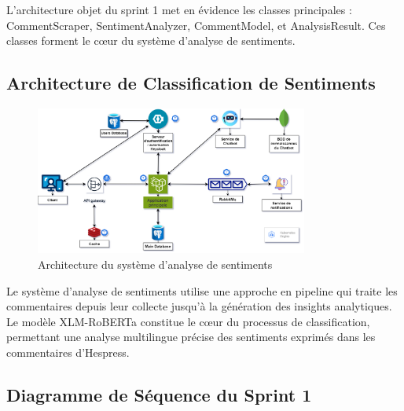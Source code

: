 L'architecture objet du sprint 1 met en évidence les classes principales : CommentScraper, SentimentAnalyzer, CommentModel, et AnalysisResult. Ces classes forment le cœur du système d'analyse de sentiments.

\subsection{Architecture de Classification de Sentiments}

\begin{figure}[H]
\centering
\includegraphics[width=0.8\textwidth]{assets/images/architecture.png}
\caption{Architecture du système d'analyse de sentiments}
\label{fig:sentiment-architecture}
\end{figure}

Le système d'analyse de sentiments utilise une approche en pipeline qui traite les commentaires depuis leur collecte jusqu'à la génération des insights analytiques. Le modèle XLM-RoBERTa constitue le cœur du processus de classification, permettant une analyse multilingue précise des sentiments exprimés dans les commentaires d'Hespress.

\subsection{Diagramme de Séquence du Sprint 1}

